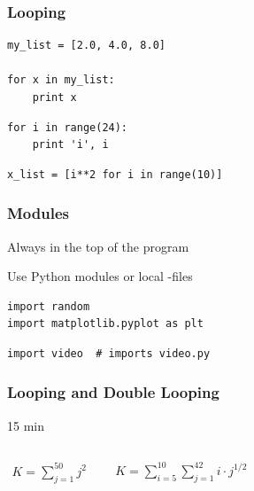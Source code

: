 \begin{frame}[fragile]

    \frametitle{Looping}


\begin{lstlisting}
my_list = [2.0, 4.0, 8.0]

for x in my_list:
    print x
\end{lstlisting}


\begin{lstlisting}
for i in range(24):
    print 'i', i
\end{lstlisting}


\begin{lstlisting}
x_list = [i**2 for i in range(10)]
\end{lstlisting}


\end{frame}


\begin{frame}[fragile]

    \frametitle{Modules}

Always in the top of the program

Use Python modules or local -files

\bigskip

\begin{lstlisting}
import random
import matplotlib.pyplot as plt
\end{lstlisting}

\begin{lstlisting}
import video  # imports video.py
\end{lstlisting}


\end{frame}



\begin{frame}[fragile]

    \frametitle{Looping and Double Looping}

    \begin{center}
        15 min
    \end{center}

    \begin{columns}[t]


            \begin{align*}
                K = \sum_{j=1}^{50} j^2
            \end{align*}



            \begin{align*}
                K = \sum_{i=5}^{10} \sum_{j=1}^{42} i \cdot j^{1/2}
            \end{align*}


    \end{columns}

    \bigskip
    \bigskip

\end{frame}

